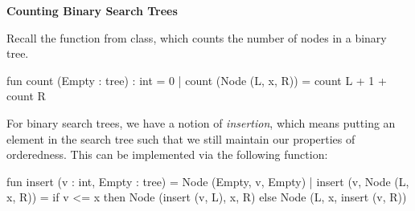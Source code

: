 \documentclass[addpoints,12pt]{exam}
\begin{document}
\begin{questions}
\textbf{Counting Binary Search Trees}

Recall the  function from class, which counts the number of
nodes in a binary tree.

\begin{codeblock}
  fun count (Empty : tree) : int = 0
    | count (Node (L, x, R)) = count L + 1 + count R
\end{codeblock}

For binary search trees, we have a notion of \textit{insertion}, which
means putting an element in the search tree such that we still maintain
our properties of orderedness. This can be implemented via the following
function:

\begin{codeblock}
  fun insert (v : int, Empty : tree) = Node (Empty, v, Empty)
    | insert (v, Node (L, x, R)) =
        if v <= x then
          Node (insert (v, L), x, R)
        else 
          Node (L, x, insert (v, R))
\end{codeblock}


\end{questions}
\end{document}
